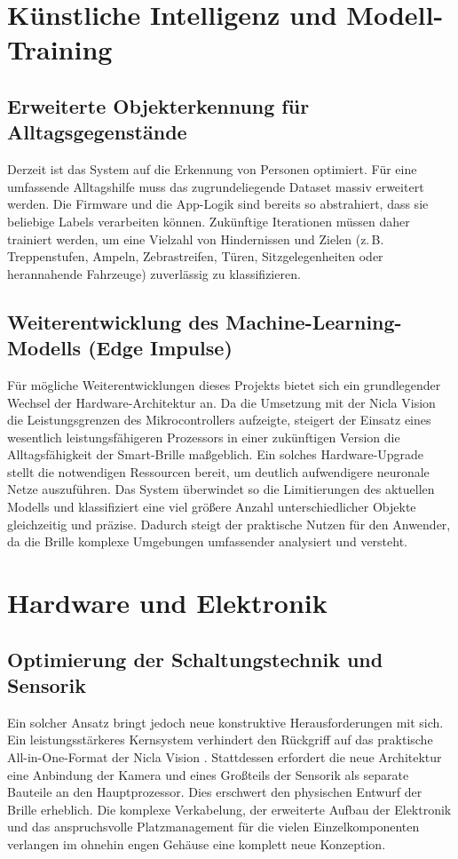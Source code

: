 \section{Künstliche Intelligenz und Modell-Training}

\subsection{Erweiterte Objekterkennung für Alltagsgegenstände}
\label{sec:future_ml_objects}
Derzeit ist das System auf die Erkennung von Personen optimiert. Für eine umfassende Alltagshilfe muss das zugrundeliegende Dataset massiv erweitert werden. Die Firmware und die App-Logik sind bereits so abstrahiert, dass sie beliebige Labels verarbeiten können. Zukünftige Iterationen müssen daher trainiert werden, um eine Vielzahl von Hindernissen und Zielen (z.\,B. Treppenstufen, Ampeln, Zebrastreifen, Türen, Sitzgelegenheiten oder herannahende Fahrzeuge) zuverlässig zu klassifizieren.

\subsection{Weiterentwicklung des Machine-Learning-Modells (Edge Impulse)}
\label{sec:future_edge_impulse}
Für mögliche Weiterentwicklungen dieses Projekts bietet sich ein grundlegender Wechsel der Hardware-Architektur an. Da die Umsetzung mit der Nicla Vision \cite{arduino_nicla_vision} die Leistungsgrenzen des Mikrocontrollers aufzeigte, steigert der Einsatz eines wesentlich leistungsfähigeren Prozessors in einer zukünftigen Version die Alltagsfähigkeit der Smart-Brille maßgeblich. Ein solches Hardware-Upgrade stellt die notwendigen Ressourcen bereit, um deutlich aufwendigere neuronale Netze auszuführen. Das System überwindet so die Limitierungen des aktuellen Modells und klassifiziert eine viel größere Anzahl unterschiedlicher Objekte gleichzeitig und präzise. Dadurch steigt der praktische Nutzen für den Anwender, da die Brille komplexe Umgebungen umfassender analysiert und versteht.

\section{Hardware und Elektronik}

\subsection{Optimierung der Schaltungstechnik und Sensorik}
\label{sec:future_elektronik}
Ein solcher Ansatz bringt jedoch neue konstruktive Herausforderungen mit sich. Ein leistungsstärkeres Kernsystem verhindert den Rückgriff auf das praktische All-in-One-Format der Nicla Vision \cite{arduino_nicla_vision}. Stattdessen erfordert die neue Architektur eine Anbindung der Kamera und eines Großteils der Sensorik als separate Bauteile an den Hauptprozessor. Dies erschwert den physischen Entwurf der Brille erheblich. Die komplexe Verkabelung, der erweiterte Aufbau der Elektronik und das anspruchsvolle Platzmanagement für die vielen Einzelkomponenten verlangen im ohnehin engen Gehäuse eine komplett neue Konzeption.

